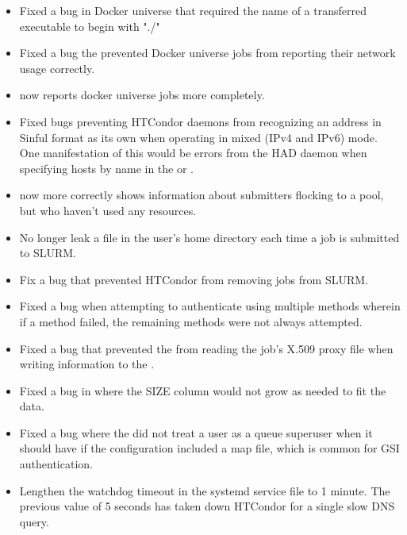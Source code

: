 \begin{itemize}

\item Fixed a bug in Docker universe that required the name
of a transferred executable to begin with "./"

\item Fixed a bug the prevented Docker universe jobs from reporting
their network usage correctly.

\item {} now reports docker universe jobs more completely.

\item Fixed bugs preventing HTCondor daemons from recognizing an address in
Sinful format as its own when operating in mixed (IPv4 and IPv6) mode.  One
manifestation of this would be errors from the HAD daemon when specifying
hosts by name in the  or .

\item {} now more correctly shows information
about submitters flocking to a pool, but who haven't used 
any resources.

\item No longer leak a file in the user's home directory each time a
job is submitted to SLURM.

\item Fix a bug that prevented HTCondor from removing jobs from SLURM.

\item Fixed a bug when attempting to authenticate using multiple
methods wherein if a method failed, the remaining methods were not
always attempted.

\item Fixed a bug that prevented the  from reading the
job's X.509 proxy file when writing information to the
.

\item Fixed a bug in  where the SIZE column would not grow as needed to fit the data.

\item Fixed a bug where the  did not treat a user as a queue superuser when it
should have if the configuration included a map file, which is common for GSI authentication.

\item Lengthen the watchdog timeout in the systemd service file to 1 minute.
The previous value of 5 seconds has taken down HTCondor for a single slow DNS
query.

\end{itemize}

